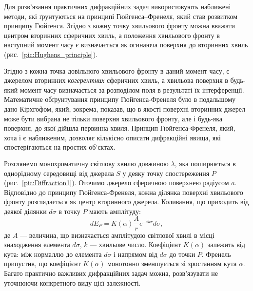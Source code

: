 Для розв’язання практичних дифракційних задач використовують наближені методи, які ґрунтуються на принципі Гюйгенса–Френеля, який став розвитком принципу Гюйгенса. Згідно з  кожну точку хвильового фронту можна вважати центром вторинних сферичних хвиль, а положення хвильового фронту в наступний момент часу є визначається як огинаюча поверхня до вторинних хвиль  (рис.~\ref{pic:Hughens_principle}).


Згідно з  кожна точка довільного хвильового фронту в даний момент часу, є джерелом вторинних \emph{когерентних} сферичних хвиль, а хвильова поверхня в будь-який момент часу визначається за розподілом поля в результаті їх інтерференції. Математичне обґрунтування принципу Гюйгенса-Френеля було в подальшому дано Кірхгофом, який, зокрема, показав, що в якості поверхні вторинних джерел може бути вибрана не тільки поверхня хвильового фронту, але і будь-яка поверхня, до якої дійшла первинна хвиля. Принцип Гюйгенса-Френеля, який, хоча і є наближеним, дозволяє кількісно описати дифракційні явища, які спостерігаються на простих об’єктах.

Розглянемо монохроматичну світлову хвилю довжиною $ \lambda $, яка поширюється в однорідному середовищі від джерела $ S $ у деяку точку спостереження $ P $ (рис.~\ref{pic:Diffraction1}). Оточимо джерело сферичною поверхнею радіусом $ a $. Відповідно до принципу Гюйгенса-Френеля, кожна ділянка поверхні хвильового фронту розглядається як центр вторинного джерела. Коливання, що приходить від деякої ділянки $ d\sigma $ в точку $ P $ мають амплітуду:
\begin{equation*}
    dE_P = K(\alpha) \frac{A}{r}  e^{-i k r} d\sigma ,
\end{equation*}
де $ A $ --- величина, що визначається амплітудою світлової хвилі в місці знаходження елемента $ d\sigma $, $ k $ --- хвильове число. Коефіцієнт $ K(\alpha) $ залежить від кута: між нормаллю до елемента $ d\sigma $ і напрямом від $ d\sigma $ до точки $ P $. Френель припустив, що коефіцієнт $ K(\alpha) $ монотонно зменшується зі зростанням кута $ \alpha $. Багато практично важливих дифракційних задач можна,
розв'язувати не уточнюючи конкретного виду цієї залежності.

